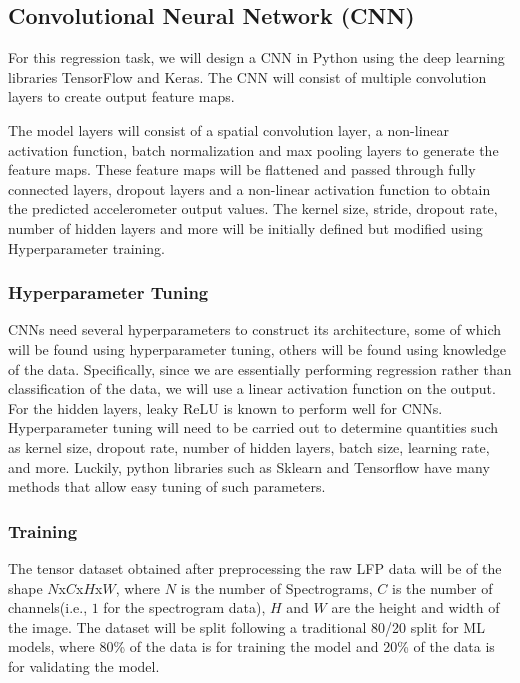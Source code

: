 \documentclass[12pt]{article}
\begin{document}
\subsection{Convolutional Neural Network (CNN)}

For this regression task, we will design a CNN in Python using the deep learning libraries TensorFlow and Keras. The CNN will consist of multiple convolution layers to create output feature maps. \cite{Angrick2019}

The model layers will consist of a spatial convolution layer, a non-linear activation function, batch normalization and max pooling layers to generate the feature maps. These feature maps will be flattened and passed through fully connected layers, dropout layers and a non-linear activation function to obtain the predicted accelerometer output values. The kernel size, stride, dropout rate, number of hidden layers and more will be initially defined but modified using Hyperparameter training.

\subsubsection{Hyperparameter Tuning}

CNNs need several hyperparameters to construct its architecture, some of which will be found using hyperparameter tuning, others will be found using knowledge of the data. Specifically, since we are essentially performing regression rather than classification of the data, we will use a linear activation function on the output. For the hidden layers, leaky ReLU is known to perform well for CNNs. Hyperparameter tuning will need to be carried out to determine quantities such as kernel size, dropout rate, number of hidden layers, batch size, learning rate, and more. Luckily, python libraries such as Sklearn and Tensorflow have many methods that allow easy tuning of such parameters.

\subsubsection{Training} 

The tensor dataset obtained after preprocessing the raw LFP data will be of the shape $N$x$C$x$H$x$W$, where $N$ is the number of Spectrograms, $C$ is the number of channels(i.e., $1$ for the spectrogram data), $H$ and $W$ are the height and width of the image. The dataset will be split following a traditional 80/20 split for ML models, where 80\% of the data is for training the model and 20\% of the data is for validating the model.
\end{document}
